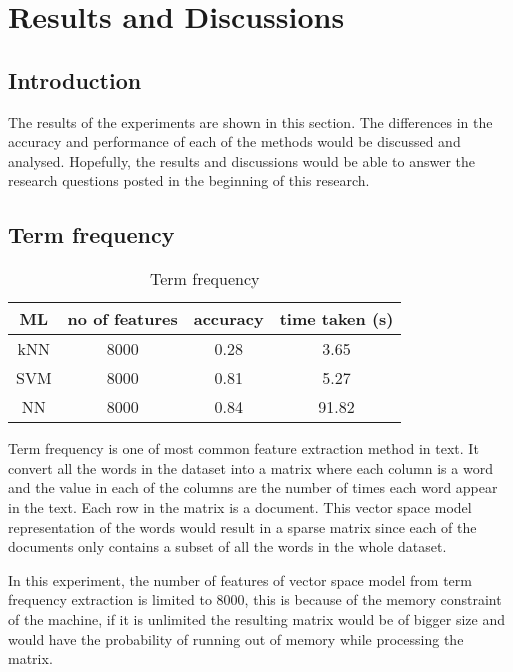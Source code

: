 
\chapter{Results and Discussions}

\section{Introduction}
The results of the experiments are shown in this section. The differences in the accuracy and performance of each of the methods would be discussed and analysed. Hopefully, the results and discussions would be able to answer the research questions posted in the beginning of this research.

\section{Term frequency}

\begin{table}[ht]
	\centering
	\begin{tabular}{|| c | c | c | c||}
		\hline
		ML & no of features & accuracy & time taken (s) \\ [0.5ex]
		\hline\hline
		kNN & 8000 & 0.28 & 3.65 \\ 
		\hline
		SVM & 8000 & 0.81 & 5.27 \\
		\hline
		NN & 8000 & 0.84 & 91.82 \\
		\hline
	\end{tabular}
\caption{Term frequency}
\label{tbl:termFrequency}
\end{table}

Term frequency is one of most common feature extraction method in text. It convert all the words in the dataset into a matrix where each column is a word and the value in each of the columns are the number of times each word appear in the text. Each row in the matrix is a document. This vector space model representation of the words would result in a sparse matrix since each of the documents only contains a subset of all the words in the whole dataset. 

In this experiment, the number of features of vector space model from term frequency extraction is limited to 8000, this is because of the memory constraint of the machine, if it is unlimited the resulting matrix would be of bigger size and would have the probability of running out of memory while processing the matrix. 

